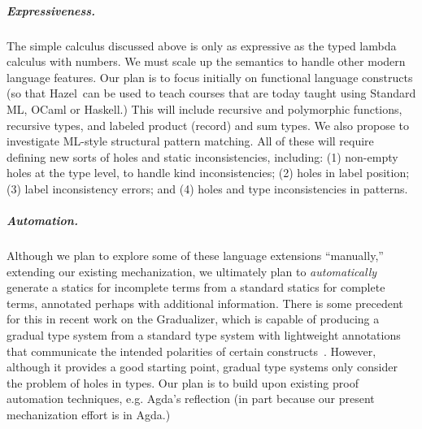 \documentclass[letterpaper,USenglish]{lipics-v2016}
\newcommand{\Hazel}[0]{\textsf{Hazel}}
\newcommand{\HazelEnv}[0]{\Hazel}
\begin{document}
\subparagraph{Expressiveness.} The simple calculus discussed above 
    is only as expressive as the typed lambda calculus with numbers. We must scale up the semantics to handle other modern language
    features. Our plan is to focus initially on functional language
    constructs (so that \HazelEnv ~can be used to teach courses that
    are today taught using Standard ML, OCaml or Haskell.) This will include recursive and
    polymorphic functions, recursive types, and labeled product (record) and sum types.
    We also propose to investigate ML-style structural pattern
    matching. All of these will require defining new sorts of holes and static
    inconsistencies, including: (1) non-empty holes at the type level, to handle
    kind inconsistencies; (2) holes in label position; (3) label inconsistency
    errors; and (4) holes and type inconsistencies in patterns. 

\subparagraph{Automation.} Although we plan to
    explore some of these language extensions 
    ``manually,'' extending our existing mechanization, we ultimately plan 
    to \emph{automatically}
    generate a statics for incomplete terms from a standard statics for complete terms,
    annotated perhaps with additional information. There is some precedent for
    this in recent work on the Gradualizer, which is capable of
    producing a gradual type system from a standard type system with lightweight
    annotations that communicate the intended polarities of certain
    constructs~\cite{DBLP:conf/popl/CiminiS16}. However, although it provides a good starting point, gradual type systems 
    only consider the problem of holes in 
    types.
    Our plan is to build 
    upon existing proof automation techniques, e.g. Agda's reflection \cite{van2012engineering} (in part because our present mechanization effort is in Agda.)
\end{document}
